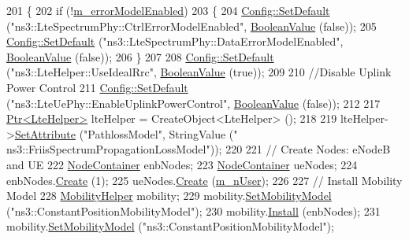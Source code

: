 \begin{DoxyCode}
201 \{
202   \textcolor{keywordflow}{if} (!\hyperlink{classLenaFdBetFfMacSchedulerTestCase1_a877001b40a970d4d4e5208e1fe76f423}{m\_errorModelEnabled})
203     \{
204       \hyperlink{group__config_ga2e7882df849d8ba4aaad31c934c40c06}{Config::SetDefault} (\textcolor{stringliteral}{"ns3::LteSpectrumPhy::CtrlErrorModelEnabled"}, 
      \hyperlink{classns3_1_1BooleanValue}{BooleanValue} (\textcolor{keyword}{false}));
205       \hyperlink{group__config_ga2e7882df849d8ba4aaad31c934c40c06}{Config::SetDefault} (\textcolor{stringliteral}{"ns3::LteSpectrumPhy::DataErrorModelEnabled"}, 
      \hyperlink{classns3_1_1BooleanValue}{BooleanValue} (\textcolor{keyword}{false}));
206     \}
207 
208   \hyperlink{group__config_ga2e7882df849d8ba4aaad31c934c40c06}{Config::SetDefault} (\textcolor{stringliteral}{"ns3::LteHelper::UseIdealRrc"}, 
      \hyperlink{classns3_1_1BooleanValue}{BooleanValue} (\textcolor{keyword}{true}));
209 
210   \textcolor{comment}{//Disable Uplink Power Control}
211   \hyperlink{group__config_ga2e7882df849d8ba4aaad31c934c40c06}{Config::SetDefault} (\textcolor{stringliteral}{"ns3::LteUePhy::EnableUplinkPowerControl"}, 
      \hyperlink{classns3_1_1BooleanValue}{BooleanValue} (\textcolor{keyword}{false}));
212 
217   \hyperlink{classns3_1_1Ptr}{Ptr<LteHelper>} lteHelper = CreateObject<LteHelper> ();
218   
219   lteHelper->\hyperlink{classns3_1_1ObjectBase_ac60245d3ea4123bbc9b1d391f1f6592f}{SetAttribute} (\textcolor{stringliteral}{"PathlossModel"}, StringValue (\textcolor{stringliteral}{"
      ns3::FriisSpectrumPropagationLossModel"}));
220 
221   \textcolor{comment}{// Create Nodes: eNodeB and UE}
222   \hyperlink{classns3_1_1NodeContainer}{NodeContainer} enbNodes;
223   \hyperlink{classns3_1_1NodeContainer}{NodeContainer} ueNodes;
224   enbNodes.\hyperlink{classns3_1_1NodeContainer_a787f059e2813e8b951cc6914d11dfe69}{Create} (1);
225   ueNodes.\hyperlink{classns3_1_1NodeContainer_a787f059e2813e8b951cc6914d11dfe69}{Create} (\hyperlink{classLenaFdBetFfMacSchedulerTestCase1_a9c055f74557f2149bf01272cea885323}{m\_nUser});
226 
227   \textcolor{comment}{// Install Mobility Model}
228   \hyperlink{classns3_1_1MobilityHelper}{MobilityHelper} mobility;
229   mobility.\hyperlink{classns3_1_1MobilityHelper_a030275011b6f40682e70534d30280aba}{SetMobilityModel} (\textcolor{stringliteral}{"ns3::ConstantPositionMobilityModel"});
230   mobility.\hyperlink{classns3_1_1MobilityHelper_a07737960ee95c0777109cf2994dd97ae}{Install} (enbNodes);
231   mobility.\hyperlink{classns3_1_1MobilityHelper_a030275011b6f40682e70534d30280aba}{SetMobilityModel} (\textcolor{stringliteral}{"ns3::ConstantPositionMobilityModel"});

\end{DoxyCode}

